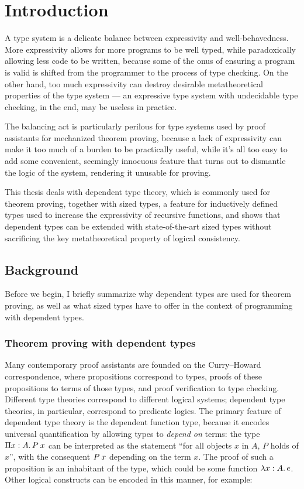 \chapter{Introduction} \label{ch:introduction}

A type system is a delicate balance between expressivity and well-behavedness.
More expressivity allows for more programs to be well typed,
while paradoxically allowing less code to be written,
because some of the onus of ensuring a program is valid is shifted
from the programmer to the process of type checking.
On the other hand, too much expressivity can destroy
desirable metatheoretical properties of the type system ---
an expressive type system with undecidable type checking,
in the end, may be useless in practice.

The balancing act is particularly perilous for type systems
used by proof assistants for mechanized theorem proving,
because a lack of expressivity can make it too much of a burden to be practically useful,
while it's all too easy to add some convenient, seemingly innocuous feature
that turns out to dismantle the logic of the system,
rendering it unusable for proving.

This thesis deals with dependent type theory, which is commonly used for theorem proving,
together with sized types, a feature for inductively defined types
used to increase the expressivity of recursive functions,
and shows that dependent types can be extended with state-of-the-art sized types
without sacrificing the key metatheoretical property of logical consistency.

\section{Background}

Before we begin, I briefly summarize why dependent types are used for theorem proving,
as well as what sized types have to offer in the context of programming with dependent types.

\subsection{Theorem proving with dependent types} \label{tt}

Many contemporary proof assistants are founded on the Curry--Howard correspondence,
where propositions correspond to types,
proofs of these propositions to terms of those types,
and proof verification to type checking.
Different type theories correspond to different logical systems;
dependent type theories, in particular, correspond to predicate logics.
The primary feature of dependent type theory is the dependent function type,
because it encodes universal quantification by allowing types to \emph{depend on} terms:
the type $\funtype{x}{A}{\app{P}{x}}$ can be interpreted as the statement
``for all objects $x$ in $A$, $P$ holds of $x$'',
with the consequent $\app{P}{x}$ depending on the term $x$.
The proof of such a proposition is an inhabitant of the type,
which could be some function $\lambda x \mathrel{:} A \mathpunct{.} e$.
Other logical constructs can be encoded in this manner, for example:


